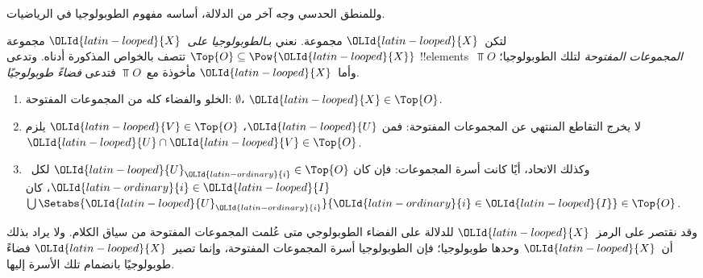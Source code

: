 \documentclass[../../../include/open-logic-section]{subfiles}
\begin{document}


وللمنطق الحدسي وجه آخر من الدلالة، أساسه مفهوم الطوبولوجيا في الرياضيات.

\begin{defn}
  لتكن~${\OLId{latin-looped}{X}}$ مجموعة. نعني بـ\emph{الطوبولوجيا على~${\OLId{latin-looped}{X}}$} مجموعة
  $\Top{O}\subseteq\Pow{{\OLId{latin-looped}{X}}}$ تتصف بالخواص المذكورة أدناه. وتدعى
  !!{element}s~$\Top{O}$ \emph{المجموعات المفتوحة} لتلك الطوبولوجيا؛
  وأما~${\OLId{latin-looped}{X}}$ مأخوذة مع~$\Top{O}$ فتدعى \emph{فضاءً طوبولوجيًا}.
  \begin{enumerate}
  \item الخلو والفضاء كله من المجموعات المفتوحة:
    $\emptyset$، ${\OLId{latin-looped}{X}} \in \Top{O}$.
  \item لا يخرج التقاطع المنتهي عن المجموعات المفتوحة: فمن
    ${\OLId{latin-looped}{U}}$، ${\OLId{latin-looped}{V}} \in \Top{O}$ يلزم~${\OLId{latin-looped}{U}} \cap {\OLId{latin-looped}{V}} \in \Top{O}$.
  \item وكذلك الاتحاد، أيًا كانت أسرة المجموعات: فإن كان
    ${\OLId{latin-looped}{U}}_{\OLId{latin-ordinary}{i}} \in \Top{O}$ لكل~${\OLId{latin-ordinary}{i}} \in {\OLId{latin-looped}{I}}$، كان
    $\bigcup \Setabs{{\OLId{latin-looped}{U}}_{\OLId{latin-ordinary}{i}}}{{\OLId{latin-ordinary}{i}} \in {\OLId{latin-looped}{I}}} \in \Top{O}$.
  \end{enumerate}
\end{defn}

وقد نقتصر على الرمز~${\OLId{latin-looped}{X}}$ للدلالة على الفضاء الطوبولوجي متى عُلمت المجموعات
المفتوحة من سياق الكلام. ولا يراد بذلك أن~${\OLId{latin-looped}{X}}$ وحدها طوبولوجيا؛ فإن
الطوبولوجيا أسرة المجموعات المفتوحة، وإنما تصير~${\OLId{latin-looped}{X}}$ فضاءً طوبولوجيًا
بانضمام تلك الأسرة إليها.
\end{document}
